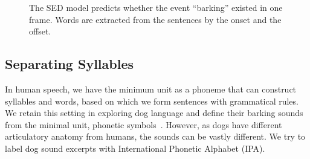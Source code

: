 \begin{figure}[th]
\centering
{}
\caption{The SED model predicts whether the event ``barking'' existed in one frame. Words are extracted from the sentences by the onset and the offset.}
\label{fig:sed}
\end{figure}


\subsection{Separating Syllables}

In human speech, we have the minimum unit as a phoneme that can construct syllables and words, based on which we form sentences with grammatical rules. We retain this setting in exploring dog language and define their barking sounds from the minimal unit, phonetic symbols~\cite{rohrmeier2015principles}. However, as dogs have different articulatory anatomy from humans, the sounds can be vastly different. We try to label dog sound excerpts with International Phonetic Alphabet (IPA).


